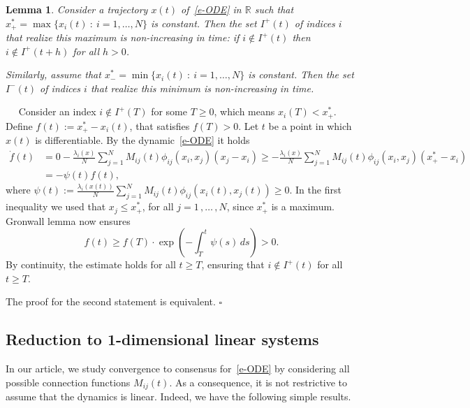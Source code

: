 \documentclass[journal]{article}
\newcommand{\R}{\mathbb{R}}
\newtheorem{lemma}{Lemma}
\newenvironment{proof}{{\it Proof.}~~}{\hfill$\square$}
\begin{document}
\begin{lemma}\label{L:belowmaximumpreserved}
Consider a trajectory $x(t)$ of~\eqref{e-ODE} in $\R$ such that $x_{+}^{*}=\max\{x_{i}(t)\ :\ i=1,\dots,N\}$ is constant.
Then the set $I^+(t)$ of indices $i$ that realize this maximum is non-increasing in time: if $i\notin I^+(t)$ then $i\notin I^+(t+h)$ for all $h>0$.

Similarly, assume that $x_{-}^{*}=\min\{x_{i}(t)\ :\ i=1,\dots,N\}$ is constant.
Then the set $I^-(t)$ of indices $i$ that realize this minimum is non-increasing in time.
\end{lemma}

\begin{proof} 
Consider an index $i\notin I^+(T)$ for some $T\geq 0$, which means $x_i(T)<x^*_+$. Define $f(t):=x^*_+-x_i(t)$, that satisfies $f(T)>0$. Let $t$ be a point in which $x(t)$ is differentiable. By the dynamic~\eqref{e-ODE} it holds
\begin{align*}
\dot f(t)&=0-\frac{\lambda_i(x)}N \sum_{j=1}^{N} M_{ij}(t)\phi_{ij}(x_i,x_j)(x_j-x_i)\geq -\frac{\lambda_i(x)}N \sum_{j=1}^{N} M_{ij}(t)\phi_{ij}(x_i,x_j)\left(x^*_+-x_i\right)\\
&=-\psi(t)f(t),
\end{align*}
where $\psi(t):=\frac{\lambda_i(x(t))}N \sum_{j=1}^{N} M_{ij}(t)\phi_{ij}(x_i(t),x_j(t))\geq 0$. In the first inequality we used that $x_{j}\leq x^{*}_{+}$, for all $j=1\,,\dots\,,N$, since $x^{*}_{+}$ is a maximum.
Gronwall lemma now ensures $$f(t)\geq f(T)\cdot\exp\left(-\int_T^t \psi(s)\,ds\right)>0.$$
By continuity, the estimate holds for all $t\geq T$, ensuring that $i\not \in I^+(t)$ for all $t\geq T$.

The proof for the second statement is equivalent.
\end{proof}




\subsection{Reduction to 1-dimensional linear systems}\label{s-reduction}
 In our article, we study convergence to consensus for~\eqref{e-ODE} by considering all possible connection functions $M_{ij}(t)$. As a consequence, it is not restrictive to assume that the dynamics is linear. Indeed, we have the following simple results.
\end{document}
